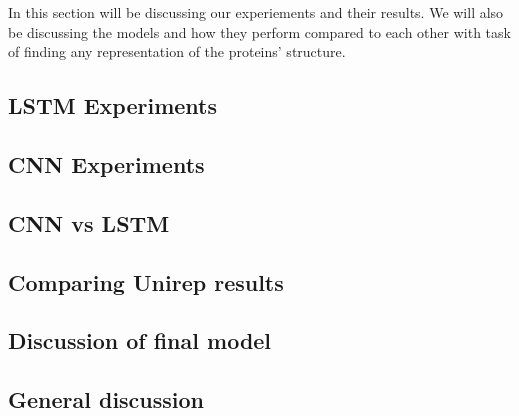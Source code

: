 In this section will be discussing our experiements and their results. We will also be discussing the models and how they perform compared to each other with task of finding any representation of the proteins' structure.

\subsection{LSTM Experiments}


\subsection{CNN Experiments}


\subsection{CNN vs LSTM}


\subsection{Comparing Unirep results}


\subsection{Discussion of final model}


\subsection{General discussion}
